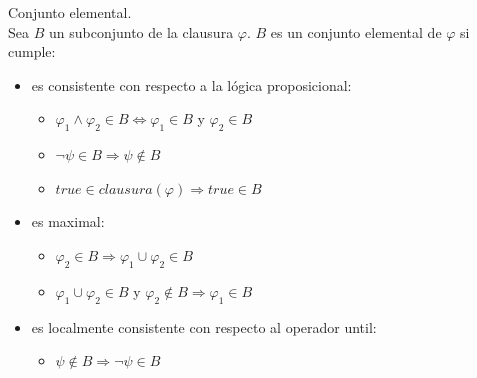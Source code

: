 \begin{definicion}
Conjunto elemental.\\
Sea $B$ un subconjunto de la clausura $\varphi$.
$B$ es un conjunto elemental de $\varphi$ si cumple:
\begin{itemize}
\item es consistente con respecto a la lógica proposicional:
	\begin{itemize}
	\item $\varphi_1 \wedge \varphi_2 \in B \Longleftrightarrow \varphi_1 \in B$ y $\varphi_2 \in B$
	\item $\neg \psi \in B \Longrightarrow \psi \not\in B$
	\item $true \in clausura(\varphi ) \Longrightarrow true \in B$
	\end{itemize}
\item es maximal:
	\begin{itemize}
	\item $\varphi_2 \in B \Longrightarrow \varphi_1 \cup \varphi_2 \in B$
	\item $\varphi_1 \cup \varphi_2 \in B$ y $\varphi_2 \not\in B \Longrightarrow \varphi_1 \in B$
	\end{itemize}
\item es localmente consistente con respecto al operador until:
	\begin{itemize}
	\item $\psi \not\in B \Longrightarrow \neg \psi \in B$
	\end{itemize}
\end{itemize}
\end{definicion}





